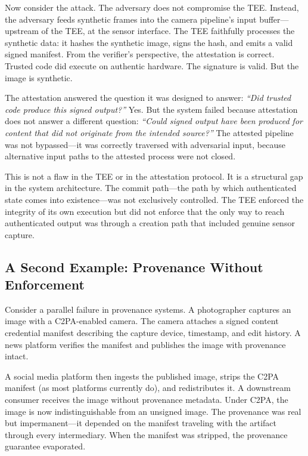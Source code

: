 \documentclass[11pt,letterpaper]{article}
\theoremstyle{occplain}
\theoremstyle{occremark}
\begin{document}
Now consider the attack. The adversary does not compromise the TEE. Instead, the adversary feeds synthetic frames into the camera pipeline's input buffer---upstream of the TEE, at the sensor interface. The TEE faithfully processes the synthetic data: it hashes the synthetic image, signs the hash, and emits a valid signed manifest. From the verifier's perspective, the attestation is correct. Trusted code did execute on authentic hardware. The signature is valid. But the image is synthetic.

The attestation answered the question it was designed to answer: \emph{``Did trusted code produce this signed output?''} Yes. But the system failed because attestation does not answer a different question: \emph{``Could signed output have been produced for content that did not originate from the intended source?''} The attested pipeline was not bypassed---it was correctly traversed with adversarial input, because alternative input paths to the attested process were not closed.

This is not a flaw in the TEE or in the attestation protocol. It is a structural gap in the system architecture. The commit path---the path by which authenticated state comes into existence---was not exclusively controlled. The TEE enforced the integrity of its own execution but did not enforce that the only way to reach authenticated output was through a creation path that included genuine sensor capture.


\subsection{A Second Example: Provenance Without Enforcement}
\label{sec:provenance-example}

Consider a parallel failure in provenance systems. A photographer captures an image with a C2PA-enabled camera. The camera attaches a signed content credential manifest describing the capture device, timestamp, and edit history. A news platform verifies the manifest and publishes the image with provenance intact.

A social media platform then ingests the published image, strips the C2PA manifest (as most platforms currently do), and redistributes it. A downstream consumer receives the image without provenance metadata. Under C2PA, the image is now indistinguishable from an unsigned image. The provenance was real but impermanent---it depended on the manifest traveling with the artifact through every intermediary. When the manifest was stripped, the provenance guarantee evaporated.
\end{document}
